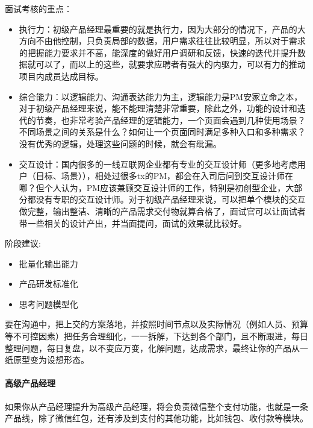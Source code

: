 \documentclass[letterpaper,11pt,english]{sphinxmanual}
\begin{document}
面试考核的重点：
\begin{itemize}
\item {} 
执行力：初级产品经理最重要的就是执行力，因为大部分的情况下，产品的大方向不由他控制，只负责局部的数据，用户需求往往比较明显，所以对于需求的把握能力要求并不高，能深度的做好用户调研和反馈，快速的迭代并提升数据就可以了，而以上的这些，就要求应聘者有强大的内驱力，可以有力的推动项目内成员达成目标。

\item {} 
综合能力：以逻辑能力、沟通表达能力为主，逻辑能力是PM安家立命之本，对于初级产品经理来说，能不能理清楚非常重要，除此之外，功能的设计和迭代的节奏，也非常考验产品经理的逻辑能力，一个页面会遇到几种使用场景？不同场景之间的关系是什么？如何让一个页面同时满足多种入口和多种需求？没有优秀的逻辑，处理这些问题的时候，就会有纰漏。

\item {} 
交互设计：国内很多的一线互联网企业都有专业的交互设计师（更多地考虑用户（目标、场景）），相处过很多tx的PM，都会在入司后问到交互设计师在哪？但个人认为，PM应该兼顾交互设计师的工作，特别是初创型企业，大部分都没有专职的交互设计师。对于初级产品经理来说，可以把单个模块的交互做完整，输出整洁、清晰的产品需求交付物就算合格了，面试官可以让面试者带一些相关的设计产出，并当面提问，面试的效果就比较好。

\end{itemize}

阶段建议:
\begin{itemize}
\item {} 
批量化输出能力

\item {} 
产品研发标准化

\item {} 
思考问题模型化

\end{itemize}

要在沟通中，把上交的方案落地，并按照时间节点以及实际情况（例如人员、预算等不可控因素）把任务合理细化，一一拆解，下达到各个部门，且不断跟进，每日整理问题，每日复盘，以不变应万变，化解问题，达成需求，最终让你的产品从一纸原型变为设想形态。%
\begin{footnote}[602]\sphinxAtStartFootnote
{}
%
\end{footnote}


\paragraph{高级产品经理}
\label{\detokenize{chapter_experience/career_path:id10}}
如果你从产品经理提升为高级产品经理，将会负责微信整个支付功能，也就是一条产品线，除了微信红包，还有涉及到支付的其他功能，比如钱包、收付款等模块。
\end{document}
